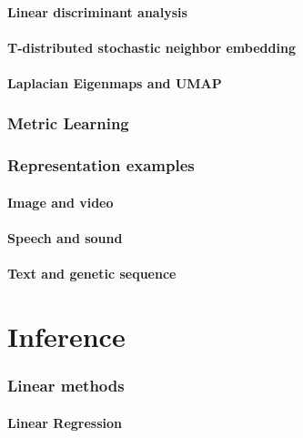 \documentclass[10pt]{article}
\begin{document}
\subsection{Linear discriminant analysis}

\subsection{T-distributed stochastic neighbor embedding}

\subsection{Laplacian Eigenmaps and UMAP}

\section{Metric Learning}

\section{Representation examples}

\subsection{Image and video}

\subsection{Speech and sound}

\subsection{Text and genetic sequence}




\newpage

\part{Inference}

\section{Linear methods}

\subsection{Linear Regression}
\end{document}
